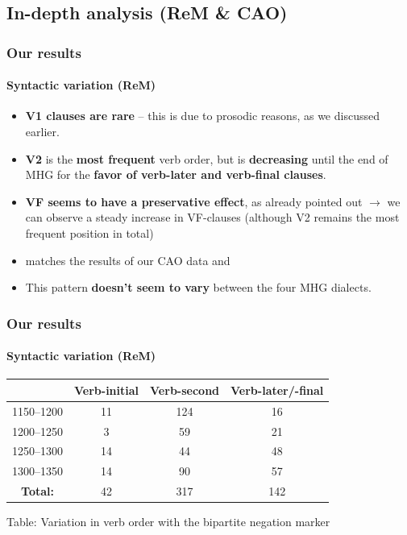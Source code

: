 \documentclass[xcolor=table, compress, %
handout
]{beamer}
\begin{document}
\subsection{In-depth analysis (ReM \& CAO)}
\begin{frame}
\frametitle{Our results}
\framesubtitle{Syntactic variation (ReM)}
    
    \begin{itemize}
        \item \textbf{V1 clauses are rare} – this is due to prosodic reasons, as we discussed earlier.
        \item \textbf{V2} is the \textbf{most frequent} verb order, but is \textbf{decreasing} until the end of MHG for the \textbf{favor of verb-later and verb-final clauses}.
        \item \textbf{VF seems to have a preservative effect}, as \citet[245]{behaghel18} already pointed out $\rightarrow$ we can observe a steady increase in VF-clauses (although V2 remains the most frequent position in total)
        \item matches the results of our CAO data and \citet{HertelimErscheinen}
        \item This pattern \textbf{doesn't seem to vary} between the four MHG dialects.
        
    \end{itemize}
    
\end{frame}

\begin{frame}
\frametitle{Our results}
\framesubtitle{Syntactic variation (ReM)}

\begin{center}
\begin{tabular}{c c c c}
\toprule
 & \textbf{Verb-initial} & \textbf{Verb-second} & \textbf{Verb-later/-final}\\
\hline
\hline
1150–1200 & 11 & \alert{124} & \alert{16}\\
1200–1250 & 3 & \alert{59} & \alert{21}\\
1250–1300 & 14 & \alert{44} & \alert{48}\\
1300–1350 & 14 & \alert{90} & \alert{57}\\ 
\hline
\hline
\textbf{Total:} & 42 & 317 & 142\\
\end{tabular}
\end{center}
\begin{center}
Table: Variation in verb order with the bipartite negation marker
\end{center}

\end{frame}
\end{document}
